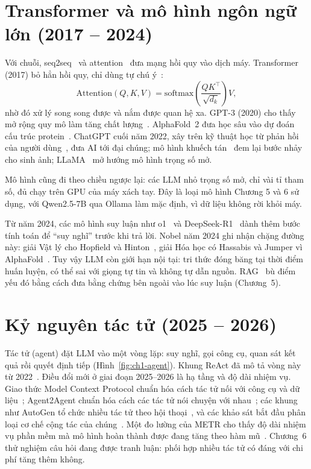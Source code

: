 \section{Transformer và mô hình ngôn ngữ lớn (2017 -- 2024)}

Với chuỗi, seq2seq~\cite{ch1:sutskever2014} và attention~\cite{ch1:bahdanau2015} đưa mạng hồi quy vào dịch máy. Transformer (2017) bỏ hẳn hồi
quy, chỉ dùng tự chú ý~\cite{ch1:vaswani2017}:
\begin{equation}
  \mathrm{Attention}(Q,K,V)=\mathrm{softmax}\!\left(\frac{QK^\top}{\sqrt{d_k}}\right)V,
\end{equation}
nhờ đó xử lý song song được và nắm được quan hệ xa. GPT-3 (2020) cho thấy mở rộng quy mô làm tăng chất lượng~\cite{ch1:brown2020}. AlphaFold~2
đưa học sâu vào dự đoán cấu trúc protein~\cite{ch1:jumper2021}. ChatGPT cuối năm 2022, xây trên kỹ thuật học từ phản hồi của người
dùng~\cite{ch1:ouyang2022}, đưa AI tới đại chúng; mô hình khuếch tán~\cite{ch1:ho2020} đem lại bước nhảy cho sinh ảnh; LLaMA~\cite{ch1:touvron2023} mở
hướng mô hình trọng số mở.

Mô hình cũng đi theo chiều ngược lại: các LLM nhỏ trọng số mở, chỉ vài tỉ tham số, đủ chạy trên GPU của máy xách tay. Đây là loại mô hình Chương 5 và 6 sử dụng, với Qwen2.5-7B qua Ollama làm mặc định, vì
dữ liệu không rời khỏi máy.

Từ năm 2024, các mô hình suy luận như o1~\cite{ch1:openai2024o1} và DeepSeek-R1~\cite{ch1:deepseek2025} dành thêm bước tính toán để ``suy nghĩ'' trước khi
trả lời. Nobel năm 2024 ghi nhận chặng đường này: giải Vật lý cho Hopfield và Hinton~\cite{ch1:nobel2024phys}, giải Hóa học có Hassabis và
Jumper vì AlphaFold~\cite{ch1:nobel2024chem}. Tuy vậy LLM còn giới hạn nội tại: tri thức đóng băng tại thời điểm huấn luyện, có thể sai với giọng tự tin
và không tự dẫn nguồn. RAG~\cite{ch1:lewis2020} bù điểm yếu đó bằng cách đưa bằng chứng bên ngoài vào lúc suy luận (Chương~5).

\section{Kỷ nguyên tác tử (2025 -- 2026)}

Tác tử (agent) đặt LLM vào một vòng lặp: suy nghĩ, gọi công cụ, quan sát kết quả rồi quyết định tiếp (Hình~\ref{fig:ch1-agent}). Khung ReAct đã mô tả
vòng này từ 2022~\cite{ch1:yao2023}. Điều đổi mới ở giai đoạn 2025--2026 là hạ tầng và độ dài nhiệm vụ. Giao thức Model Context Protocol
chuẩn hóa cách tác tử nối với công cụ và dữ liệu~\cite{ch1:mcp2024}; Agent2Agent chuẩn hóa cách các tác tử nói chuyện với nhau~\cite{ch1:a2a2025}; các khung như
AutoGen tổ chức nhiều tác tử theo hội thoại~\cite{ch1:wu2023autogen}, và các khảo sát bắt đầu phân loại cơ chế cộng tác của chúng~\cite{ch1:tran2025}. Một đo lường
của METR cho thấy độ dài nhiệm vụ phần mềm mà mô hình hoàn thành được đang tăng theo hàm mũ~\cite{ch1:kwa2025}. Chương~6 thử nghiệm câu hỏi đang được tranh
luận: phối hợp nhiều tác tử có đáng với chi phí tăng thêm không.

